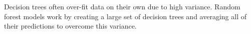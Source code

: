 Decision trees often over-fit data on their own due to high variance. Random forest models work by creating a large set of decision trees and averaging all of their predictions to overcome this variance.